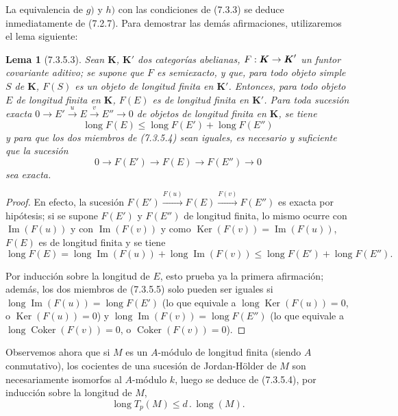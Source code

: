 \documentclass[10pt,oneside,openany]{book}
\theoremstyle{egaenv}\newtheorem*{env}{---}
\theoremstyle{egastatement}
\newtheorem*{lemma}{Lema}
\theoremstyle{egadescription}
\newcommand{\oldpage}[2][]{\marginnote{\normalfont\scriptsize\textbf{#1}\,|\,#2}\ignorespaces}
\renewcommand{\leq}{\leqslant}
\renewcommand{\to}{\mathchoice{\longrightarrow}{\rightarrow}{\rightarrow}{\rightarrow}}
\begin{document}
La equivalencia de $g)$ y $h)$ con las condiciones de (7.3.3) se deduce inmediatamente
de (7.2.7). Para demostrar las demás afirmaciones, utilizaremos el lema
siguiente:

\begin{lemma}[7.3.5.3]
Sean $\boldsymbol{K}$, $\boldsymbol{K}'$ dos categorías abelianas,
$F:\boldsymbol{K}\to\boldsymbol{K}'$ un funtor
covariante aditivo; se supone que $F$ es semiexacto, y que, para todo objeto
simple $S$ de $\boldsymbol{K}$, $F(S)$ es un objeto de longitud finita en
$\boldsymbol{K}'$. Entonces, para todo objeto $E$ de longitud finita en $\boldsymbol{K}$,
$F(E)$ es de longitud finita en $\boldsymbol{K}'$. Para toda sucesión exacta
$0\longrightarrow E'\xrightarrow{u}E\xrightarrow{v}E''\longrightarrow0$
de objetos de longitud finita en $\boldsymbol{K}$, se tiene
\[
  \operatorname{long}F(E)
  \leq
  \operatorname{long}F(E')+\operatorname{long}F(E'')
  \tag{7.3.5.4}\label{III.7.3.5.4.fr}
\]
y para que los dos miembros de \textup{(7.3.5.4)} sean iguales, es necesario y suficiente
que la sucesión
\[
  0\longrightarrow F(E')\longrightarrow F(E)\longrightarrow F(E'')
  \longrightarrow0
\]
sea exacta.
\end{lemma}

\begin{proof}
En efecto, la sucesión
$F(E')\xrightarrow{F(u)}F(E)\xrightarrow{F(v)}F(E'')$
es exacta por hipótesis; si se supone $F(E')$ y $F(E'')$ de longitud
finita, lo mismo ocurre con $\operatorname{Im}(F(u))$ y con
$\operatorname{Im}(F(v))$ y como
$\operatorname{Ker}(F(v))=\operatorname{Im}(F(u))$, $F(E)$ es de longitud
finita y se tiene
\[
  \operatorname{long}F(E)
  =
  \operatorname{long}\operatorname{Im}(F(u))
  +
  \operatorname{long}\operatorname{Im}(F(v))
  \leq
  \operatorname{long}F(E')+\operatorname{long}F(E'').
  \tag{7.3.5.5}\label{III.7.3.5.5.fr}
\]

\oldpage[III]{183}
Por inducción sobre la longitud de $E$, esto prueba ya la primera afirmación;
además, los dos miembros de (7.3.5.5) solo pueden ser iguales si
$\operatorname{long}\operatorname{Im}(F(u))=\operatorname{long}F(E')$
(lo que equivale a
$\operatorname{long}\operatorname{Ker}(F(u))=0$, o
$\operatorname{Ker}(F(u))=0$) y
$\operatorname{long}\operatorname{Im}(F(v))=\operatorname{long}F(E'')$
(lo que equivale a
$\operatorname{long}\operatorname{Coker}(F(v))=0$, o
$\operatorname{Coker}(F(v))=0$).
\end{proof}

Observemos ahora que si $M$ es un $A$-módulo de longitud finita (siendo $A$
conmutativo), los cocientes de una sucesión de Jordan-Hölder de $M$ son
necesariamente isomorfos al $A$-módulo $k$, luego se deduce de (7.3.5.4), por
inducción sobre la longitud de $M$,
\[
  \operatorname{long}T_p(M)\leq d\mathbin{.}\operatorname{long}(M).
  \tag{7.3.5.6}\label{III.7.3.5.6.fr}
\]
\end{document}
